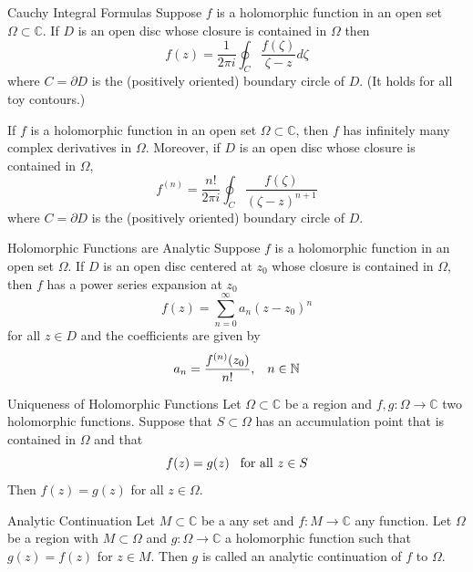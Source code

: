 \documentclass{beamer}
\begin{document}
\begin{frame}
\begin{block}{Cauchy Integral Formulas}
Suppose $f$ is a holomorphic function in an open set $\Omega\subset\mathbb{C}$. If $D$ is an open disc whose closure is contained in $\Omega$ then
$$f(z)=\dfrac{1}{2\pi i}\oint_C\dfrac{f(\zeta)}{\zeta-z}d\zeta$$
where $C=\partial D$ is the (positively oriented) boundary circle of $D$. (It holds for all toy contours.)

\end{block}
\begin{block}{}
If $f$ is a holomorphic function in an open set $\Omega\subset\mathbb{C}$, then $f$ has infinitely many complex derivatives in $\Omega$. Moreover, if $D$ is an open disc whose closure is contained in $\Omega$,
$$f^{(n)}=\dfrac{n!}{2\pi i}\oint_C\dfrac{f(\zeta)}{(\zeta-z)^{n+1}}$$
where $C=\partial D$ is the (positively oriented) boundary circle of $D$.
\end{block}
\end{frame}

\begin{frame}
\begin{block}{Holomorphic Functions are Analytic}
Suppose $f$ is a holomorphic function in an open set $\Omega$. If $D$ is an open disc centered at $z_0$ whose closure is contained in $\Omega$, then $f$ has a power series expansion at $z_0$
$$f(z)=\sum\limits_{n=0}^{\infty}a_n(z-z_0)^n$$
for all $z\in D$ and the coefficients are given by
$$a_n=\dfrac{f^{(n)}(z_0)}{n!},\hspace{3mm}n\in\mathbb{N}$$
\end{block}
\end{frame}


\begin{frame}
\begin{block}{Uniqueness of Holomorphic Functions}
Let $\Omega\subset\mathbb{C}$ be a region and $f,g:\Omega\rightarrow\mathbb{C}$ two holomorphic functions. Suppose that $S\subset\Omega$ has an accumulation point that is contained in $\Omega$ and that
$$f(z)=g(z)\hspace{3mm}\text{for all }z\in S$$
Then $f(z)=g(z)$ for all $z\in\Omega$.
\end{block}
\begin{block}{Analytic Continuation}
Let $M\subset\mathbb{C}$ be a any set and $f:M\rightarrow\mathbb{C}$ any function. Let $\Omega$ be a region with $M\subset\Omega$ and $g:\Omega\rightarrow\mathbb{C}$ a holomorphic function such that $g(z)=f(z)$ for $z\in M$. Then $g$ is called an analytic continuation of $f$ to $\Omega$.
\end{block}
\end{frame}
\end{document}
